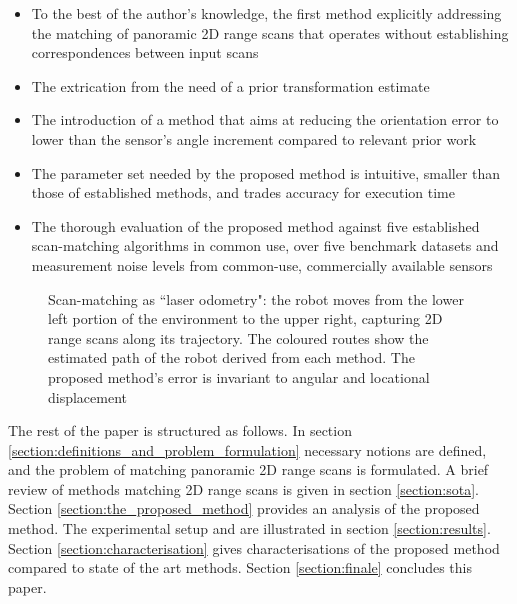 \begin{itemize}
  \item To the best of the author's knowledge, the first method explicitly
        addressing the matching of panoramic 2D range scans that operates
        without establishing correspondences between input scans
  \item The extrication from the need of a prior transformation estimate
  \item The introduction of a method that aims at reducing the orientation
        error to lower than the sensor's angle increment compared to relevant
        prior work
  \item The parameter set needed by the proposed method is intuitive, smaller
        than those of established methods, and trades accuracy for execution
        time
  \item The thorough evaluation of the proposed method against five established
        scan-matching algorithms in common use, over five benchmark datasets
        and measurement noise levels from common-use, commercially
        available sensors
\end{itemize}

\begin{figure}[]\centering
  \vspace{-1.3cm}
  
  \vspace{-2cm}
  \caption{\small Scan-matching as ``laser odometry": the robot moves from the
           lower left portion of the environment to the upper right, capturing
           2D range scans along its trajectory. The coloured routes show the
           estimated path of the robot derived from each method. The proposed
           method's error is invariant to angular and locational displacement}
  \label{fig:laser_odometry}
\end{figure}

The rest of the paper is structured as follows. In section
\ref{section:definitions_and_problem_formulation} necessary notions are
defined, and the problem of matching panoramic 2D range scans is formulated. A
brief review of methods matching 2D range scans is given in section
\ref{section:sota}. Section \ref{section:the_proposed_method} provides an
analysis of the proposed method. The experimental setup and are illustrated in
section \ref{section:results}. Section \ref{section:characterisation} gives
characterisations of the proposed method compared to state of the art methods.
Section \ref{section:finale} concludes this paper.
